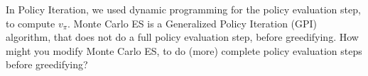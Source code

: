 
In Policy Iteration, we used dynamic programming for the policy evaluation step, to compute $v_\pi$. 
Monte Carlo ES is a Generalized Policy Iteration (GPI) algorithm, that does not do a full policy evaluation step, before greedifying. How might you modify Monte Carlo ES, to do (more) complete policy evaluation steps before greedifying?

%
%
%
